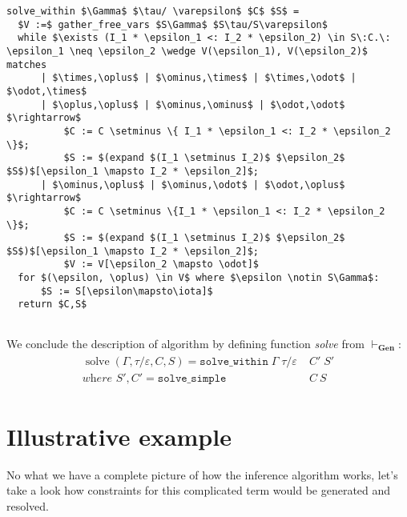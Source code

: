 \documentclass[declaration,shortabstract]{iithesis}
\theoremstyle{definition} \newtheorem{definition}{Definition}[section]
\begin{document}
\begin{lstlisting}
solve_within $\Gamma$ $\tau/ \varepsilon$ $C$ $S$ =
  $V :=$ gather_free_vars $S\Gamma$ $S\tau/S\varepsilon$
  while $\exists (I_1 * \epsilon_1 <: I_2 * \epsilon_2) \in S\:C.\: \epsilon_1 \neq \epsilon_2 \wedge V(\epsilon_1), V(\epsilon_2)$ matches
      | $\times,\oplus$ | $\ominus,\times$ | $\times,\odot$ | $\odot,\times$
      | $\oplus,\oplus$ | $\ominus,\ominus$ | $\odot,\odot$ $\rightarrow$
          $C := C \setminus \{ I_1 * \epsilon_1 <: I_2 * \epsilon_2 \}$;
          $S := $(expand $(I_1 \setminus I_2)$ $\epsilon_2$ $S$)$[\epsilon_1 \mapsto I_2 * \epsilon_2]$;
      | $\ominus,\oplus$ | $\ominus,\odot$ | $\odot,\oplus$ $\rightarrow$
          $C := C \setminus \{I_1 * \epsilon_1 <: I_2 * \epsilon_2 \}$;
          $S := $(expand $(I_1 \setminus I_2)$ $\epsilon_2$ $S$)$[\epsilon_1 \mapsto I_2 * \epsilon_2]$;
          $V := V[\epsilon_2 \mapsto \odot]$
  for $(\epsilon, \oplus) \in V$ where $\epsilon \notin S\Gamma$:
      $S := S[\epsilon\mapsto\iota]$
  return $C,S$
  
\end{lstlisting}
We conclude the description of algorithm by
defining function \textit{solve} from $\vdash_\textbf{Gen}$:
\begin{gather*}\begin{aligned}
\operatorname{solve}(\Gamma, \tau/\varepsilon, C, S) = 
    \texttt{solve\_within}\;\Gamma\;\tau / \varepsilon\;& C'\;S' \\
    \textit{where } S', C' = \texttt{solve\_simple}\;& C\:S 
\end{aligned}
\end{gather*}

\section{Illustrative example}
No what we have a complete picture of how the inference algorithm works, let's take a look how constraints for this complicated term would be generated and resolved.
\end{document}
